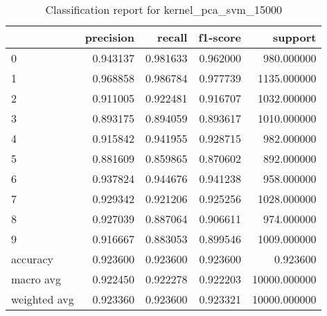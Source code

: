 \begin{table}[htb!]
\centering
\caption{Classification report for kernel_pca_svm_15000}
\label{tab:classification-report-kernel_pca_svm_15000}
\begin{tabular}{lrrrr}
\toprule
 & precision & recall & f1-score & support \\
\midrule
0 & 0.943137 & 0.981633 & 0.962000 & 980.000000 \\
1 & 0.968858 & 0.986784 & 0.977739 & 1135.000000 \\
2 & 0.911005 & 0.922481 & 0.916707 & 1032.000000 \\
3 & 0.893175 & 0.894059 & 0.893617 & 1010.000000 \\
4 & 0.915842 & 0.941955 & 0.928715 & 982.000000 \\
5 & 0.881609 & 0.859865 & 0.870602 & 892.000000 \\
6 & 0.937824 & 0.944676 & 0.941238 & 958.000000 \\
7 & 0.929342 & 0.921206 & 0.925256 & 1028.000000 \\
8 & 0.927039 & 0.887064 & 0.906611 & 974.000000 \\
9 & 0.916667 & 0.883053 & 0.899546 & 1009.000000 \\
accuracy & 0.923600 & 0.923600 & 0.923600 & 0.923600 \\
macro avg & 0.922450 & 0.922278 & 0.922203 & 10000.000000 \\
weighted avg & 0.923360 & 0.923600 & 0.923321 & 10000.000000 \\
\bottomrule
\end{tabular}
\end{table}

